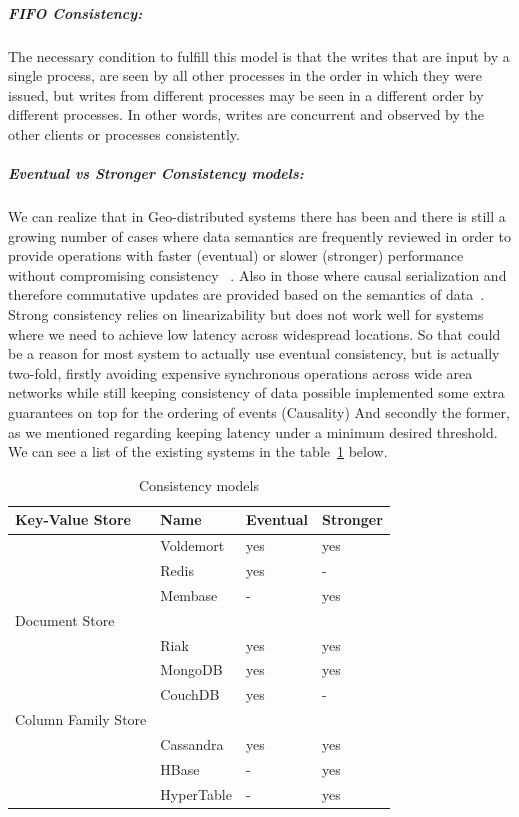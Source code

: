 		\subparagraph{FIFO Consistency:}
	The necessary condition to fulfill this model is that the writes that are input by a single process, are seen by all other processes in the order in which they were issued, but writes from different processes may be seen in a different order by different processes. In other words, writes are concurrent and observed by the other clients or processes consistently.
	
		\subparagraph{Eventual vs Stronger Consistency models:}
		We can realize that in Geo-distributed systems there has been and there is still a growing number of cases where data semantics are frequently reviewed in order to provide operations with faster (eventual) or slower (stronger) performance without compromising consistency ~\cite{Li:2012}. Also in those where causal serialization and therefore commutative updates are provided based on the semantics of data~\cite{Saphiro:2011}. Strong consistency relies on linearizability but does not work well for systems where we need to achieve low latency across widespread locations. So that could be a reason for most system to actually use eventual consistency, but is actually two-fold, firstly avoiding expensive synchronous operations across wide area networks while still keeping consistency of data possible implemented some extra guarantees on top for the ordering of events (Causality) And secondly the former, as we mentioned regarding keeping latency under a minimum desired threshold. We can see a list of the existing systems in the table~\ref{table:consistency} below.
		
		\begin{table}[t]
		\begin{center}
    			\begin{tabular}{ | p{5cm} | l | l | l |}
   			\hline
			Key-Value Store & Name & Eventual & Stronger \\ \hline   		
			 & Voldemort & yes & yes\\ \hline
			 & Redis & yes & - \\ \hline
			 & Membase & - & yes\\ \hline
			
			Document Store &  &  & \\ \hline
			 & Riak & yes & yes \\ \hline			
			 & MongoDB & yes & yes \\ \hline
			 & CouchDB & yes & - \\ \hline
			Column Family Store &  &  & \\ \hline
			 & Cassandra & yes & yes \\ \hline
			 & HBase & - & yes \\ \hline
			 & HyperTable & - & yes \\ \hline
    			\end{tabular}
		\end{center}
		\caption{Consistency models}
		\label{table:consistency}
		\end{table}	

